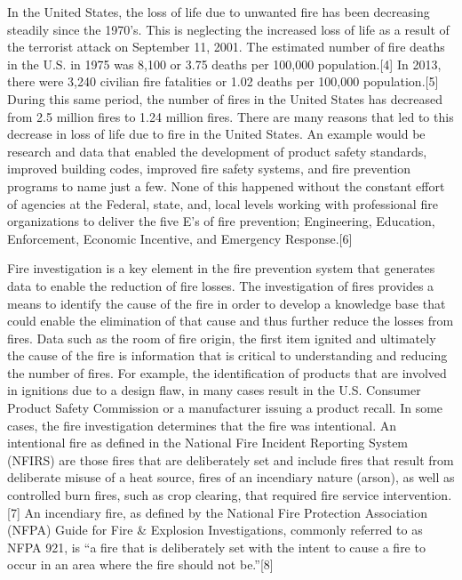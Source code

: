 \documentclass[twoside]{uocthesis}
\begin{document}
In the United States, the loss of life due to unwanted fire has been decreasing steadily since the 1970’s.  This is neglecting the increased loss of life as a result of the terrorist attack on September 11, 2001.  The estimated number of fire deaths in the U.S. in 1975 was 8,100 or 3.75 deaths per 100,000 population.[4]  In 2013, there were 3,240 civilian fire fatalities or 1.02 deaths per 100,000 population.[5]  During this same period, the number of fires in the United States has decreased from 2.5 million fires to 1.24 million fires.  There are many reasons that led to this decrease in loss of life due to fire in the United States.  An example would be research and data that enabled the development of product safety standards, improved building codes, improved fire safety systems, and fire prevention programs to name just a few.  None of this happened without the constant effort of agencies at the Federal, state, and, local levels working with professional fire organizations to deliver the five E’s of fire prevention; Engineering, Education, Enforcement, Economic Incentive, and Emergency Response.[6] 
 
Fire investigation is a key element in the fire prevention system that generates data to enable the reduction of fire losses.  The investigation of fires provides a means to identify the cause of the fire in order to develop a knowledge base that could enable the elimination of that cause and thus further reduce the losses from fires.  Data such as the room of fire origin, the first item ignited and ultimately the cause of the fire is information that is critical to understanding and reducing the number of fires.  For example, the identification of products that are involved in ignitions due to a design flaw, in many cases result in the U.S. Consumer Product Safety Commission or a manufacturer issuing a product recall.  
In some cases, the fire investigation determines that the fire was intentional.  An intentional fire as defined in the National Fire Incident Reporting System (NFIRS)  are those fires that are deliberately set and include fires that result from deliberate misuse of a heat source, fires of an incendiary nature (arson), as well as controlled burn fires, such as crop clearing, that required fire service intervention.[7]  An incendiary fire, as defined by the National Fire Protection Association (NFPA) Guide for Fire \& Explosion Investigations, commonly referred to as NFPA 921, is “a fire that is deliberately set with the intent to cause a fire to occur in an area where the fire should not be.”[8]
\end{document}
